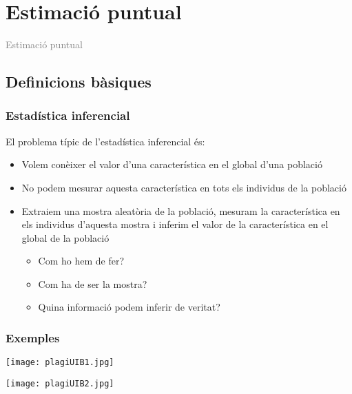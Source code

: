 \documentclass[12pt,t]{beamer}
\title[\red{Matemàtiques III}]{}
\author[]{}
\date{}
\newcommand{\gray}[1]{\textcolor{gray}{#1}}
\renewcommand{\emph}[1]{{\color{red}#1}}
\theoremstyle{plain}
\theoremstyle{definition}
\begin{document}
\beamertemplatedotitem

\lstset{breaklines=true}
\lstset{basicstyle=\ttfamily}


\section{Estimació puntual}

\begin{frame}
\vfill
\begin{center}
\gray{\LARGE Estimació puntual}
\end{center}
\vfill
\end{frame}






\subsection{Definicions bàsiques}


\begin{frame}
\frametitle{Estadística inferencial}

El problema típic de l'\emph{estadística inferencial} és:

\begin{itemize}

\item Volem conèixer el valor  d'una característica en el global d'una població
\medskip

\item No podem mesurar aquesta característica en tots els individus de la població
\medskip

\item Extraiem una mostra aleatòria de la població, mesuram la característica en els individus d'aquesta mostra i \emph{inferim} el valor de la característica en el global de la població

\begin{itemize}
\item Com ho hem de fer?
\item Com ha de ser la mostra?
\item Quina informació podem inferir de veritat?
\end{itemize}
\end{itemize}
\end{frame}



\begin{frame}
\frametitle{Exemples}

\begin{center}
\hspace*{-0.5cm}
\texttt{[image: plagiUIB1.jpg]}\pause\bigskip

\hspace*{-0.5cm}\texttt{[image: plagiUIB2.jpg]}
\end{center}
\end{frame}
\end{document}
